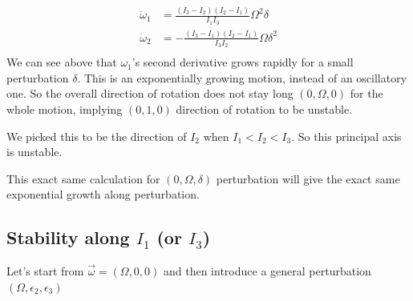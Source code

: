 \documentclass[letter, 10pts]{article}
\begin{document}
\begin{align*}
\ddot{\omega}_1 &=
\frac{(I_3 - I_2)(I_2 - I_1)}{I_1 I_3} \Omega^2 \delta 
\\
\ddot \omega_2 
		&= - 
\frac{(I_3 - I_1)(I_2 - I_1)}{I_3 I_2} \Omega \delta^2  \\
\end{align*}
We can see above that $\omega_1$'s second derivative grows rapidly for a small perturbation $\delta$. This is an exponentially growing motion, instead of an oscillatory one. So the overall direction of rotation does not stay long $\left( 0 , \Omega , 0 \right) $ for the whole motion, implying $(0,1,0)$ direction of rotation to be unstable. 

We picked this to be the direction of $I_2$ when $I_1 < I_2 < I_3$. So this principal axis is unstable. 

This exact same calculation for $(0, \Omega, \delta)$ perturbation will give the exact same exponential growth along perturbation. 

\subsection*{Stability along $I_1$ (or $I_3$)}
Let's start from $\vec{\omega} = \left(\Omega, 0,0\right)$ and then introduce a general perturbation $\left(\Omega, \epsilon_2, \epsilon_3\right)$
\end{document}
